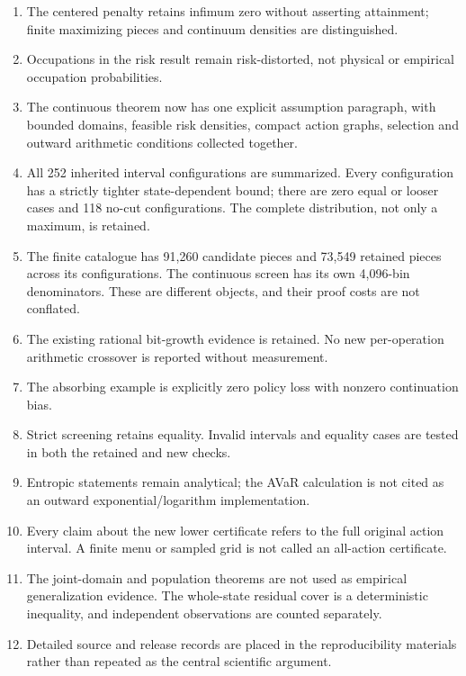 \begin{enumerate}
\def\labelenumi{\arabic{enumi}.}
\tightlist
\item
  The centered penalty retains infimum zero without asserting
  attainment; finite maximizing pieces and continuum densities are
  distinguished.
\item
  Occupations in the risk result remain risk-distorted, not physical or
  empirical occupation probabilities.
\item
  The continuous theorem now has one explicit assumption paragraph, with
  bounded domains, feasible risk densities, compact action graphs,
  selection and outward arithmetic conditions collected together.
\item
  All 252 inherited interval configurations are summarized. Every
  configuration has a strictly tighter state-dependent bound; there are
  zero equal or looser cases and 118 no-cut configurations. The complete
  distribution, not only a maximum, is retained.
\item
  The finite catalogue has 91,260 candidate pieces and 73,549 retained
  pieces across its configurations. The continuous screen has its own
  4,096-bin denominators. These are different objects, and their proof
  costs are not conflated.
\item
  The existing rational bit-growth evidence is retained. No new
  per-operation arithmetic crossover is reported without measurement.
\item
  The absorbing example is explicitly zero policy loss with nonzero
  continuation bias.
\item
  Strict screening retains equality. Invalid intervals and equality
  cases are tested in both the retained and new checks.
\item
  Entropic statements remain analytical; the AVaR calculation is not
  cited as an outward exponential/logarithm implementation.
\item
  Every claim about the new lower certificate refers to the full
  original action interval. A finite menu or sampled grid is not called
  an all-action certificate.
\item
  The joint-domain and population theorems are not used as empirical
  generalization evidence. The whole-state residual cover is a
  deterministic inequality, and independent observations are counted
  separately.
\item
  Detailed source and release records are placed in the reproducibility
  materials rather than repeated as the central scientific argument.
\end{enumerate}

